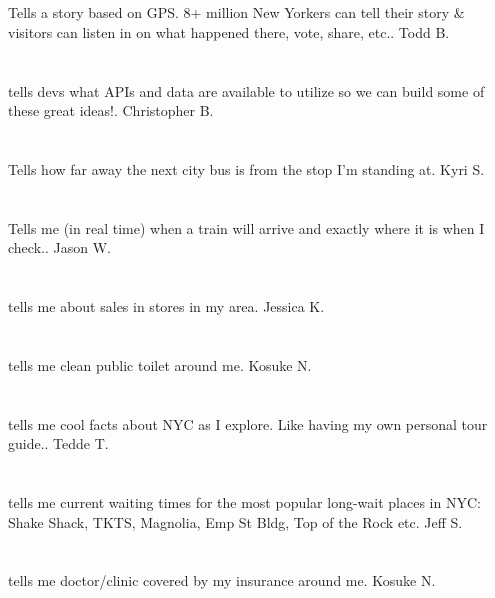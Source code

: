 \section{}Tells a story based on GPS. 8+ million New Yorkers can tell their story \& visitors can listen in on what happened there,  vote,  share,  etc.. Todd B.
\section{}tells devs what APIs and data are available to utilize so we can build some of these great ideas!. Christopher B.
\section{}Tells how far away the next city bus is from the stop I'm standing at. Kyri S.
\section{}Tells me (in real time) when a train will arrive and exactly where it is when I check.. Jason W.
\section{}tells me about sales in stores in my area. Jessica K.
\section{}tells me clean public toilet around me. Kosuke N.
\section{}tells me cool facts about NYC as I explore. Like having my own personal tour guide.. Tedde T.
\section{}tells me current waiting times for the most popular long-wait places in NYC: Shake Shack,  TKTS,  Magnolia,   Emp St Bldg,  Top of the Rock etc. Jeff S.
\section{}tells me doctor/clinic covered by my insurance around me. Kosuke N.
